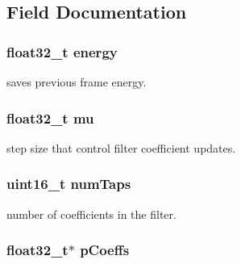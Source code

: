 \subsection{Field Documentation}
\hypertarget{structarm__lms__norm__instance__f32_ae1ed544b72f1510ed55d144a9424fddd}{
\subsubsection[{energy}]{\setlength{\rightskip}{0pt plus 5cm}float32\-\_\-t energy}}\label{structarm__lms__norm__instance__f32_ae1ed544b72f1510ed55d144a9424fddd}
saves previous frame energy. \hypertarget{structarm__lms__norm__instance__f32_a11402afa7c9b9dac4cb953fa386e74d2}{
\subsubsection[{mu}]{\setlength{\rightskip}{0pt plus 5cm}float32\-\_\-t mu}}\label{structarm__lms__norm__instance__f32_a11402afa7c9b9dac4cb953fa386e74d2}
step size that control filter coefficient updates. \hypertarget{structarm__lms__norm__instance__f32_a751941891e47f522a7f5375fe8990aac}{
\subsubsection[{num\-Taps}]{\setlength{\rightskip}{0pt plus 5cm}uint16\-\_\-t num\-Taps}}\label{structarm__lms__norm__instance__f32_a751941891e47f522a7f5375fe8990aac}
number of coefficients in the filter. \hypertarget{structarm__lms__norm__instance__f32_aacbb8dd8eeba4b21fc2bb40076405ee3}{
\subsubsection[{p\-Coeffs}]{\setlength{\rightskip}{0pt plus 5cm}float32\-\_\-t$\ast$ p\-Coeffs}}\label{structarm__lms__norm__instance__f32_aacbb8dd8eeba4b21fc2bb40076405ee3}
